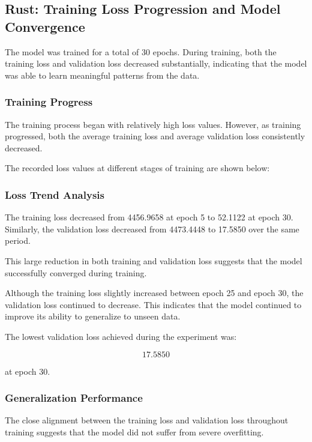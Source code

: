 \documentclass{ieeeaccess}
\begin{document}
\subsection{Rust: Training Loss Progression and Model Convergence}

The model was trained for a total of 30 epochs. During training, both the training loss and validation loss decreased substantially, indicating that the model was able to learn meaningful patterns from the data.

\subsubsection{Training Progress}

The training process began with relatively high loss values. However, as training progressed, both the average training loss and average validation loss consistently decreased.

The recorded loss values at different stages of training are shown below:



\subsubsection{Loss Trend Analysis}

The training loss decreased from 4456.9658 at epoch 5 to 52.1122 at epoch 30. Similarly, the validation loss decreased from 4473.4448 to 17.5850 over the same period.

This large reduction in both training and validation loss suggests that the model successfully converged during training.

Although the training loss slightly increased between epoch 25 and epoch 30, the validation loss continued to decrease. This indicates that the model continued to improve its ability to generalize to unseen data.

The lowest validation loss achieved during the experiment was:

\[
17.5850
\]

at epoch 30.

\subsubsection{Generalization Performance}

The close alignment between the training loss and validation loss throughout training suggests that the model did not suffer from severe overfitting.
\end{document}
